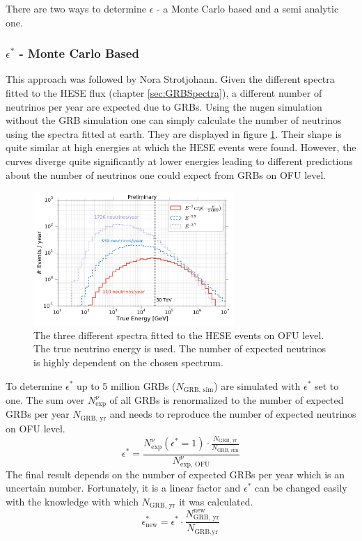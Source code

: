 There are two ways to determine $\epsilon$ - a Monte Carlo based and a semi
analytic one.
\subsubsection{$\epsilon^*$ - Monte Carlo Based}
This approach was followed by Nora Strotjohann. Given the different
spectra fitted to the HESE flux (chapter \ref{sec:GRBSpectra}), a different
number of neutrinos per year are expected due to GRBs. Using the nugen
simulation without the GRB simulation one can simply calculate the number of
neutrinos using the spectra fitted at earth. They are displayed in figure
\ref{fig:Espectra}. Their shape is quite similar at high energies at which the
HESE events were found. However, the curves diverge quite significantly at
lower energies leading to different predictions about the number of neutrinos
one could expect from GRBs on OFU level.

\begin{figure}[h]
\centering
 \captionsetup{width=.68\textwidth}
\includegraphics[width=0.68\textwidth]{fig/Spectra_on_OFU.pdf}
    \caption{The three different spectra fitted to the HESE events on OFU
level. The true neutrino energy is used. The number of expected neutrinos is
highly dependent on the chosen spectrum.}
\label{fig:Espectra}
\end{figure}

To determine $\epsilon^*$ up to 5 million GRBs ($N_\text{GRB, sim}$) are
simulated with $\epsilon^*$ set to one. The sum over $N_\text{exp}^\nu$ of all
GRBs is renormalized to the number of expected GRBs per year
$N_\text{GRB, yr}$ and needs to reproduce the number of expected neutrinos on
OFU level.
\begin{equation}
\epsilon^*  = \frac{N_\text{exp}^\nu (\epsilon^* = 1) \cdot
\frac{N_\text{GRB, yr}}{N_\text{GRB, sim}}}{N_{\text{exp, OFU}}^\nu}
\end{equation}
The final result depends on the number of expected GRBs per year which is an
uncertain number. Fortunately, it is a linear factor and $\epsilon^*$ can be
changed easily with the knowledge with which $N_\text{GRB, yr}$ it was
calculated.
\begin{equation}
 \epsilon_\text{new}^* = \epsilon^* \cdot \frac{N_\text{GRB,
yr}^\text{new}}{N_\text{GRB,yr}}
\end{equation}



